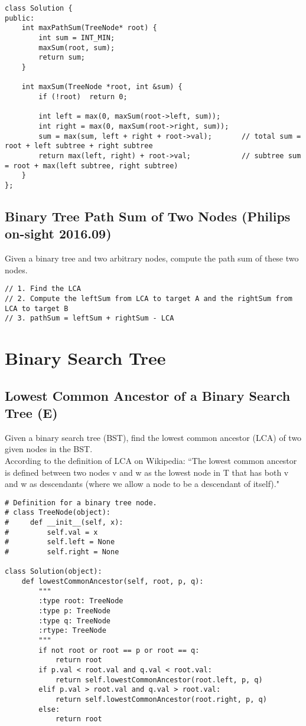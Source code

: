 \begin{lstlisting}
class Solution {
public:
    int maxPathSum(TreeNode* root) {
        int sum = INT_MIN;
        maxSum(root, sum);
        return sum;
    }
    
    int maxSum(TreeNode *root, int &sum) {
        if (!root)  return 0;
        
        int left = max(0, maxSum(root->left, sum));
        int right = max(0, maxSum(root->right, sum));
        sum = max(sum, left + right + root->val);       // total sum = root + left subtree + right subtree
        return max(left, right) + root->val;            // subtree sum = root + max(left subtree, right subtree)
    }
};
\end{lstlisting}


\subsection{Binary Tree Path Sum of Two Nodes (Philips on-sight 2016.09)}
Given a binary tree and two arbitrary nodes, compute the path sum of these two nodes.

\begin{lstlisting}
// 1. Find the LCA
// 2. Compute the leftSum from LCA to target A and the rightSum from LCA to target B 
// 3. pathSum = leftSum + rightSum - LCA
\end{lstlisting}


\section{Binary Search Tree}
\subsection{Lowest Common Ancestor of a Binary Search Tree (E)}
Given a binary search tree (BST), find the lowest common ancestor (LCA) of two given nodes in the BST. \\

According to the definition of LCA on Wikipedia: ``The lowest common ancestor is defined between two nodes v and w as the lowest node in T that has both v and w as descendants (where we allow a node to be a descendant of itself)." \\

\begin{lstlisting}
# Definition for a binary tree node.
# class TreeNode(object):
#     def __init__(self, x):
#         self.val = x
#         self.left = None
#         self.right = None

class Solution(object):
    def lowestCommonAncestor(self, root, p, q):
        """
        :type root: TreeNode
        :type p: TreeNode
        :type q: TreeNode
        :rtype: TreeNode
        """
        if not root or root == p or root == q:
            return root
        if p.val < root.val and q.val < root.val:
            return self.lowestCommonAncestor(root.left, p, q)
        elif p.val > root.val and q.val > root.val:
            return self.lowestCommonAncestor(root.right, p, q)
        else:
            return root
\end{lstlisting}

